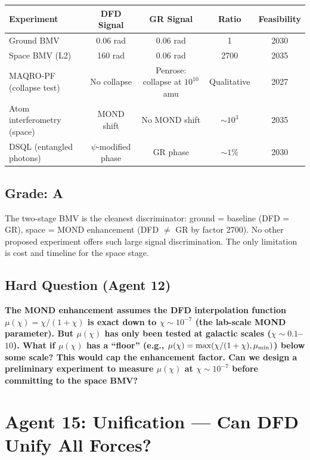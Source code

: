 \documentclass[11pt,a4paper]{article}
\begin{document}
\begin{center}
\begin{tabular}{lcccc}
\toprule
\textbf{Experiment} & \textbf{DFD Signal} & \textbf{GR Signal} & \textbf{Ratio} & \textbf{Feasibility} \\
\midrule
Ground BMV & 0.06 rad & 0.06 rad & 1 & 2030 \\
Space BMV (L2) & 160 rad & 0.06 rad & 2700 & 2035 \\
MAQRO-PF (collapse test) & No collapse & Penrose: collapse at $10^{10}$ amu & Qualitative & 2027 \\
Atom interferometry (space) & MOND shift & No MOND shift & $\sim 10^3$ & 2035 \\
DSQL (entangled photons) & $\psi$-modified phase & GR phase & $\sim 1\%$ & 2030 \\
\bottomrule
\end{tabular}
\end{center}

\subsection{Grade: A}

The two-stage BMV is the cleanest discriminator: ground = baseline (DFD = GR), space = MOND enhancement (DFD $\neq$ GR by factor 2700). No other proposed experiment offers such large signal discrimination. The only limitation is cost and timeline for the space stage.

\subsection{Hard Question (Agent 12)}

\textbf{The MOND enhancement assumes the DFD interpolation function $\mu(\chi) = \chi/(1+\chi)$ is exact down to $\chi \sim 10^{-7}$ (the lab-scale MOND parameter). But $\mu(\chi)$ has only been tested at galactic scales ($\chi \sim 0.1$--$10$). What if $\mu(\chi)$ has a ``floor'' (e.g., $\mu(\chi) = \max(\chi/(1+\chi), \mu_{\rm min})$) below some scale? This would cap the enhancement factor. Can we design a preliminary experiment to measure $\mu(\chi)$ at $\chi \sim 10^{-7}$ before committing to the space BMV?}

\newpage

\section{Agent 15: Unification --- Can DFD Unify All Forces?}
\label{sec:agent15}
\end{document}
